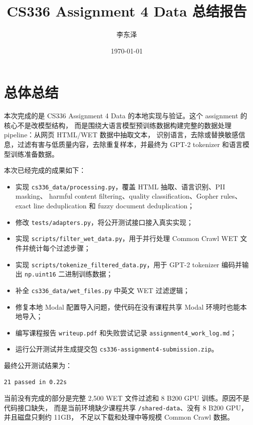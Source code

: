 \documentclass[UTF8,11pt]{ctexart}
\title{CS336 Assignment 4 Data 总结报告}
\author{李东泽}
\date{\today}
\begin{document}
\maketitle

\section{总体总结}

本次完成的是 CS336 Assignment 4 Data 的本地实现与验证。这个 assignment 的核心不是改模型结构，
而是围绕大语言模型预训练数据构建完整的数据处理 pipeline：从网页 HTML/WET 数据中抽取文本，
识别语言，去除或替换敏感信息，过滤有害与低质量内容，去除重复样本，并最终为 GPT-2 tokenizer
和语言模型训练准备数据。

本次已经完成的成果如下：

\begin{itemize}
  \item 实现 \texttt{cs336\_data/processing.py}，覆盖 HTML 抽取、语言识别、PII masking、
  harmful content filtering、quality classification、Gopher rules、exact line deduplication
  和 fuzzy document deduplication；
  \item 修改 \texttt{tests/adapters.py}，将公开测试接口接入真实实现；
  \item 实现 \texttt{scripts/filter\_wet\_data.py}，用于并行处理 Common Crawl WET 文件并统计每个过滤步骤；
  \item 实现 \texttt{scripts/tokenize\_filtered\_data.py}，用于 GPT-2 tokenizer 编码并输出 \texttt{np.uint16} 二进制训练数据；
  \item 补全 \texttt{cs336\_data/wet\_files.py} 中英文 WET 过滤逻辑；
  \item 修复本地 Modal 配置导入问题，使代码在没有课程共享 Modal 环境时也能本地导入；
  \item 编写课程报告 \texttt{writeup.pdf} 和失败尝试记录 \texttt{assignment4\_work\_log.md}；
  \item 运行公开测试并生成提交包 \texttt{cs336-assignment4-submission.zip}。
\end{itemize}

最终公开测试结果为：

\begin{lstlisting}
21 passed in 0.22s
\end{lstlisting}

当前没有完成的部分是完整 2,500 WET 文件过滤和 8 B200 GPU 训练。原因不是代码接口缺失，
而是当前环境缺少课程共享 \texttt{/shared-data}、没有 8 B200 GPU，并且磁盘只剩约 11GB，
不足以下载和处理中等规模 Common Crawl 数据。
\end{document}

